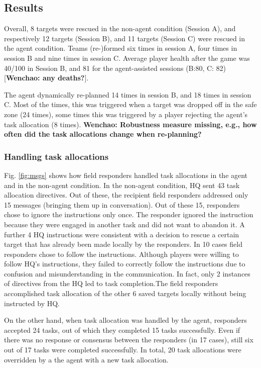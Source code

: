 \subsection{Results}
Overall, 8 targets were rescued in the non-agent condition (Session A), and respectively 12 targets (Session B), and 11 targets (Session C) were rescued in the agent condition. Teams (re-)formed six times in session A, four times in session B and nine times  in session C. Average player health after the game was 40/100 in Session B, and 81 for the agent-assisted sessions (B:80, C: 82) [\textbf{Wenchao: any deaths?}]. 

The agent dynamically re-planned 14 times in session B, and 18 times in session C. Most of the times, this was triggered when a target was dropped off in the safe zone (24 times), some times this was triggered by a player rejecting the agent's task allocation (8 times).  \textbf{Wenchao: Robustness measure missing, e.g., how often did the task allocations change when re-planning?}

\subsubsection{Handling task allocations}
Fig. \ref{fig:msgs} shows how field responders handled task allocations in the agent and in the non-agent condition. In the non-agent condition, HQ sent 43 task allocation directives. Out of these, the recipient field responders addressed only 15 messages (bringing them up in conversation). Out of these 15, responders chose to ignore the instructions only once. The responder ignored the instruction because they were engaged in another task and did not want to abandon it. A further 4 HQ instructions were consistent with a decision to rescue a certain target that has already been made locally by the responders. In 10 cases field responders chose to follow the instructions. Although players were willing to follow HQ's instructions, they failed to correctly follow the instructions due to confusion and misunderstanding in the communication. In fact, only 2 instances of directives from the HQ led to task completion.The field responders accomplished task allocation of the other 6 saved targets locally without being instructed by HQ.

On the other hand, when task allocation was handled by the agent, responders accepted 24 tasks, out of which they completed 15 tasks successfully. Even if there was no response or consensus between the responders (in 17 cases), still six out of 17 tasks were completed successfully. In total, 20 task allocations were overridden by a the agent with a new task allocation. 


